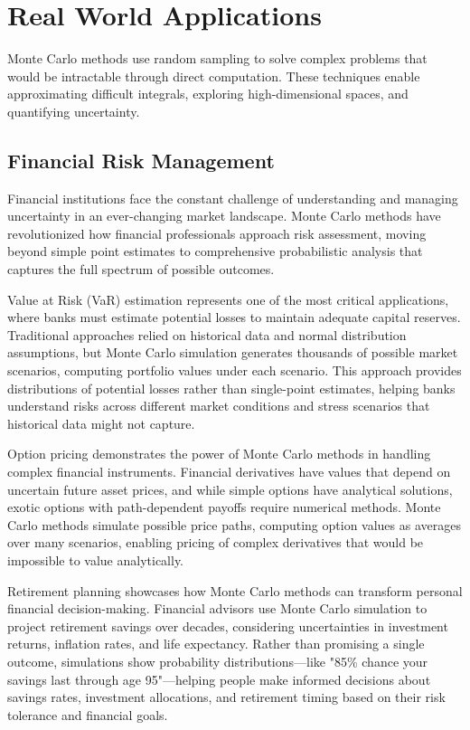 
\section{Real World Applications}
\label{sec:monte-carlo-real-world}


Monte Carlo methods use random sampling to solve complex problems that would be intractable through direct computation. These techniques enable approximating difficult integrals, exploring high-dimensional spaces, and quantifying uncertainty.

\subsection{Financial Risk Management}

Financial institutions face the constant challenge of understanding and managing uncertainty in an ever-changing market landscape. Monte Carlo methods have revolutionized how financial professionals approach risk assessment, moving beyond simple point estimates to comprehensive probabilistic analysis that captures the full spectrum of possible outcomes.

Value at Risk (VaR) estimation represents one of the most critical applications, where banks must estimate potential losses to maintain adequate capital reserves. Traditional approaches relied on historical data and normal distribution assumptions, but Monte Carlo simulation generates thousands of possible market scenarios, computing portfolio values under each scenario. This approach provides distributions of potential losses rather than single-point estimates, helping banks understand risks across different market conditions and stress scenarios that historical data might not capture.

Option pricing demonstrates the power of Monte Carlo methods in handling complex financial instruments. Financial derivatives have values that depend on uncertain future asset prices, and while simple options have analytical solutions, exotic options with path-dependent payoffs require numerical methods. Monte Carlo methods simulate possible price paths, computing option values as averages over many scenarios, enabling pricing of complex derivatives that would be impossible to value analytically.

Retirement planning showcases how Monte Carlo methods can transform personal financial decision-making. Financial advisors use Monte Carlo simulation to project retirement savings over decades, considering uncertainties in investment returns, inflation rates, and life expectancy. Rather than promising a single outcome, simulations show probability distributions—like "85\% chance your savings last through age 95"—helping people make informed decisions about savings rates, investment allocations, and retirement timing based on their risk tolerance and financial goals.

